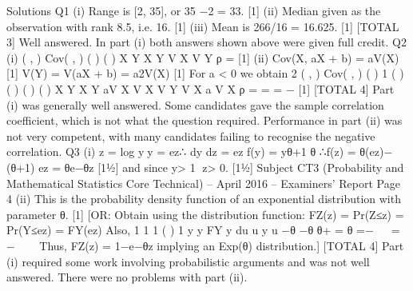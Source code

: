 \documentclass[a4paper,12pt]{article}
\begin{document}
Solutions
Q1 (i) Range is [2, 35], or 35 −2 = 33. [1]
(ii) Median given as the observation with rank 8.5, i.e. 16. [1]
(iii) Mean is 266/16 = 16.625. [1]
[TOTAL 3]
Well answered. In part (i) both answers shown above were given full credit.
Q2 (i) ( , ) Cov( , )
( ) ( )
X Y X Y
V X V Y
ρ = [1]
(ii) Cov(X, aX + b) = aV(X) [1]
V(Y) = V(aX + b) = a2V(X) [1]
For a < 0 we obtain
2
( , ) Cov( , ) ( ) 1
( ) ( ) ( ) ( )
X Y X Y aV X
V X V Y V X a V X
ρ = = = − [1]
[TOTAL 4]
Part (i) was generally well answered. Some candidates gave the sample correlation coefficient, which is not what the question required.
Performance in part (ii) was not very competent, with many candidates
failing to recognise the negative correlation.
Q3 (i) z = log yy = ez∴ dy
dz
= ez
f(y) = yθ+1
θ
∴f(z) = θ(ez)−(θ+1) ez = θe−θz [1½]
and since y> 1 z> 0. [1½]
Subject CT3 (Probability and Mathematical Statistics Core Technical) – April 2016 – Examiners’ Report
Page 4
(ii) This is the probability density function of an exponential distribution with
parameter θ. [1]
[OR: Obtain using the distribution function:
    FZ(z) = Pr(Z≤z) = Pr(Y≤ez) = FY(ez)
  Also, 1 1
  1
  ( ) 1
  y y
  FY y du u y
  u
  −θ −θ
  θ+
    = θ =−   = −   
  Thus, FZ(z) = 1−e−θz implying an Exp(θ) distribution.]
[TOTAL 4]
Part (i) required some work involving probabilistic arguments and was not well
answered. There were no problems with part (ii).
\end{document}
